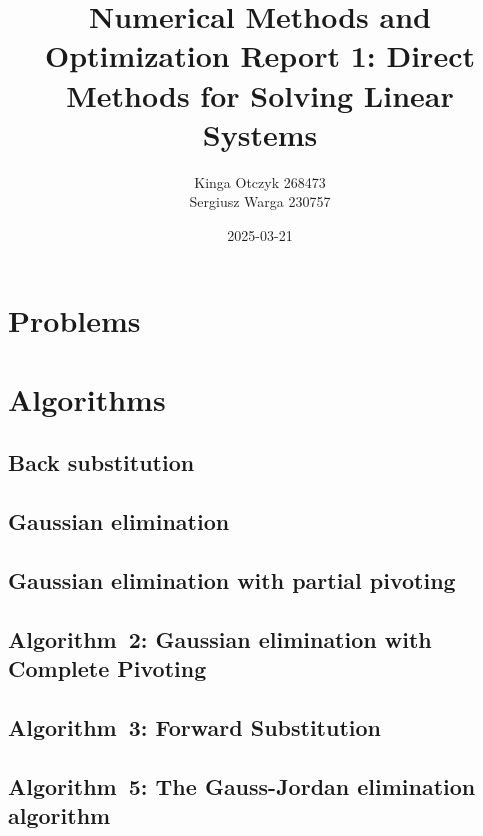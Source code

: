 \documentclass[a4paper]{article}
\title{Numerical Methods and Optimization Report 1:
  Direct Methods for Solving Linear Systems}
\author{Kinga Otczyk 268473\\Sergiusz Warga 230757}
\date{2025-03-21}
\begin{document}
\maketitle
\tableofcontents
\pagebreak

\section{Problems}









\clearpage

\section{Algorithms}
\subsection{Back substitution}%
\label{algorithm:back_substitution}

\subsection{Gaussian elimination}%
\label{algorithm:gaussian_elimination}

\subsection{Gaussian elimination with partial pivoting}
\label{algorithm:gaussian_elimination_with_partial_pivoting}
\subsection{Algorithm~2: Gaussian elimination with Complete Pivoting}%
\label{algorithm:2}

\subsection{Algorithm~3: Forward Substitution}%
\label{algorithm:3}

\subsection{Algorithm~5: The Gauss-Jordan elimination algorithm}%
\label{algorithm:5}

\end{document}
